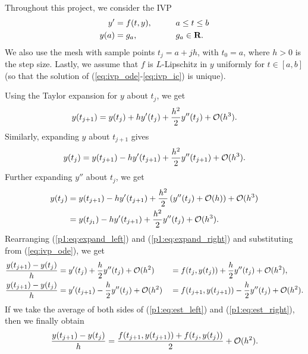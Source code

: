 \documentclass{homework}
\begin{document}
	\maketitle
	
	Throughout this project, we consider the IVP
	\begin{alignat}{2}
		\label{eq:ivp_ode}
		y' &= f(t, y),&\qquad &a \le t \le b\\
		\label{eq:ivp_ic}
		y(a) &= g_a,&\qquad &g_a \in \textbf{R}.
	\end{alignat}
	We also use the mesh with sample points $t_j = a + jh$, with $t_0 = a$, where $h > 0$ is the step size. Lastly, we assume that $f$ is $L$-Lipschitz in $y$ uniformly for $t \in [a,b]$ (so that the solution of (\ref{eq:ivp_ode}-\ref{eq:ivp_ic}) is unique).
	
	\question
	Using the Taylor expansion for $y$ about $t_j$, we get
	\begin{equation}
		\label{p1:eq:expand_right}
		y(t_{j+1}) = y(t_j) + hy'(t_j) + \frac{h^2}{2}y''(t_j) + \mathcal{O}(h^3).
	\end{equation}
	Similarly, expanding $y$ about $t_{j+1}$ gives
	\begin{equation}
		y(t_j) = y(t_{j+1}) - hy'(t_{j+1}) + \frac{h^2}{2}y''(t_{j+1}) + \mathcal{O}(h^3).
	\end{equation}
	Further expanding $y''$ about $t_j$, we get
	\begin{align}
		y(t_j) &= y(t_{j+1}) - hy'(t_{j+1}) + \frac{h^2}{2}\left(y''(t_j) + \mathcal{O}(h)\right) + \mathcal{O}(h^3) \\
		\label{p1:eq:expand_left}
		&= y(t_{j_1}) - hy'(t_{j+1}) + \frac{h^2}{2}y''(t_j) + \mathcal{O}(h^3).
	\end{align}
	Rearranging (\ref{p1:eq:expand_left}) and (\ref{p1:eq:expand_right}) and substituting from (\ref{eq:ivp_ode}), we get
	\begin{alignat}{2}
		\label{p1:eq:est_left}
		\frac{y(t_{j+1}) - y(t_j)}{h} &= y'(t_j) + \frac{h}{2}y''(t_j) + \mathcal{O}(h^2)&& = f(t_j, y(t_j)) + \frac{h}{2} y''(t_j) + \mathcal{O}(h^2), \\
		\label{p1:eq:est_right}
		\frac{y(t_{j+1}) - y(t_j)}{h} &= y'(t_{j+1}) - \frac{h}{2}y''(t_j) + \mathcal{O}(h^2)&& = f(t_{j+1}, y(t_{j+1})) - \frac{h}{2}y''(t_j) + \mathcal{O}(h^2).
	\end{alignat}
	If we take the average of both sides of (\ref{p1:eq:est_left}) and (\ref{p1:eq:est_right}), then we finally obtain
	\begin{equation}
		\frac{y(t_{j+1}) - y(t_j)}{h} = \frac{f(t_{j+1}, y(t_{j+1})) + f(t_j, y(t_j))}{2} + \mathcal{O}(h^2).
	\end{equation}
\end{document}
